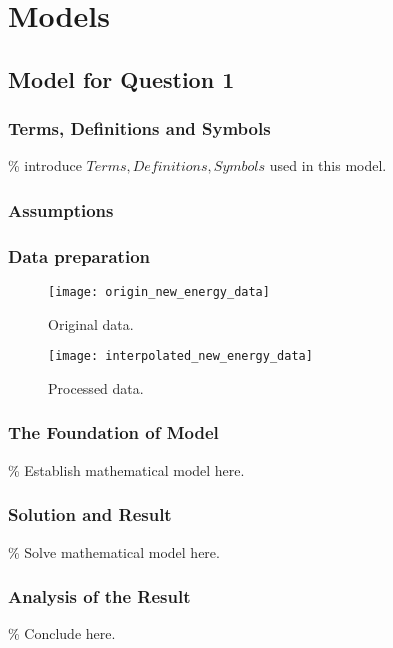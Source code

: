 \documentclass{apmcmthesis}
\begin{document}
\section{Models}

\subsection{Model for Question 1}

\subsubsection{Terms, Definitions and Symbols}
\% introduce $Terms, Definitions, Symbols$ used in this model.



\subsubsection{Assumptions}


\subsubsection{Data preparation}


\begin{figure}[htbp]
	\centering
	\texttt{[image: origin\_new\_energy\_data]}
	\caption{Original data.}
	\label{figure 1}
\end{figure}

\begin{figure}[htbp]
	\centering
	\texttt{[image: interpolated\_new\_energy\_data]}
	\caption{Processed data.}
	\label{figure 2}
\end{figure}

\subsubsection{The Foundation of Model}
\% Establish mathematical model here.


\subsubsection{Solution and Result}
\% Solve mathematical model here.


\subsubsection{Analysis of the Result}
\% Conclude here.
\end{document}
